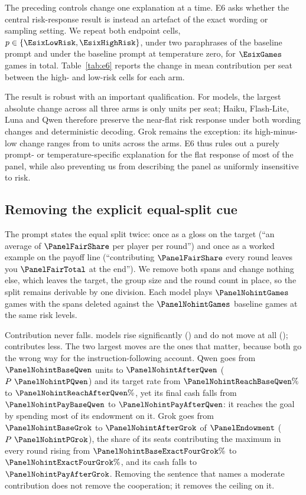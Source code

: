 The preceding controls change one explanation at a time. E6 asks whether the central
risk-response result is instead an artefact of the exact wording or sampling setting. We
repeat both endpoint cells, $p\in\{\EsixLowRisk,\EsixHighRisk\}$, under two paraphrases of
the baseline prompt and under the baseline prompt at temperature zero, for
$\EsixGames$ games in total. Table~\ref{tab:e6} reports the change in mean contribution per
seat between the high- and low-risk cells for each arm.



The result is robust with an important qualification. For \EsixStableModels{} models, the
largest absolute change across all three arms is only \EsixStableMaxDelta{} units per seat;
Haiku, Flash-Lite, Luna and Qwen therefore preserve the near-flat risk response under both
wording changes and deterministic decoding. Grok remains the exception: its high-minus-low
change ranges from \EsixGrokDeltaMin{} to \EsixGrokDeltaMax{} units across the arms. E6 thus
rules out a purely prompt- or temperature-specific explanation for the flat response of
most of the panel, while also preventing us from describing the panel as uniformly
insensitive to risk.

\subsection{Removing the explicit equal-split cue}
\label{sec:nohint}

The prompt states the equal split twice: once as a gloss on the target (``an average of
$\PanelFairShare$ per player per round'') and once as a worked example on the payoff line
(``contributing $\PanelFairShare$ every round leaves you $\PanelFairTotal$ at the end'').
We remove both spans and change nothing else, which leaves the target, the group size and
the round count in place, so the split remains derivable by one division. Each model plays
$\PanelNohintGames$ games with the spans deleted against the $\PanelNohintGames$ baseline
games at the same risk levels.

Contribution never falls. \PanelNohintUpWordCap{} models rise significantly
(\PanelNohintUpModels{}) and \PanelNohintFlatWord{} do not move at all
(\PanelNohintFlatModels{}); \PanelNohintDownWord{} contributes less. The two largest
moves are the ones that matter, because both go the wrong way for the
instruction-following account. Qwen goes from $\PanelNohintBaseQwen$
units to $\PanelNohintAfterQwen$ ($P~\PanelNohintPQwen$) and its target rate from
$\PanelNohintReachBaseQwen\%$ to $\PanelNohintReachAfterQwen\%$, yet its final cash falls
from $\PanelNohintPayBaseQwen$ to $\PanelNohintPayAfterQwen$: it reaches the goal by
spending most of its endowment on it. Grok goes from
$\PanelNohintBaseGrok$ to $\PanelNohintAfterGrok$ of $\PanelEndowment$
($P~\PanelNohintPGrok$), the share of its seats contributing the maximum in every round
rising from $\PanelNohintBaseExactFourGrok\%$ to $\PanelNohintExactFourGrok\%$, and its
cash falls to $\PanelNohintPayAfterGrok$. Removing the sentence that names a moderate
contribution does not remove the cooperation; it removes the ceiling on it.

